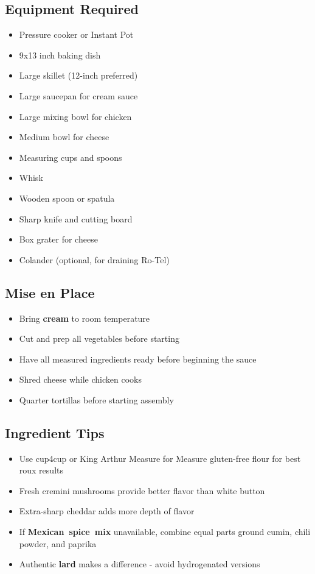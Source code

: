 \documentclass[11pt,letterpaper]{article}
\begin{document}
{\small
\setlength{\columnsep}{20pt}
\setlength{\multicolsep}{6pt}
\begin{multicols}{2}
\setlength{\parindent}{0pt}
\setlength{\parskip}{4pt}

\subsection*{Equipment Required}
\begin{itemize}
    \item Pressure cooker or Instant Pot
    \item 9x13 inch baking dish
    \item Large skillet (12-inch preferred)
    \item Large saucepan for cream sauce
    \item Large mixing bowl for chicken
    \item Medium bowl for cheese
    \item Measuring cups and spoons
    \item Whisk
    \item Wooden spoon or spatula
    \item Sharp knife and cutting board
    \item Box grater for cheese
    \item Colander (optional, for draining Ro-Tel)
\end{itemize}

\subsection*{Mise en Place}
\begin{itemize}
    \item Bring \textbf{cream} to room temperature
    \item Cut and prep all vegetables before starting
    \item Have all measured ingredients ready before beginning the sauce
    \item Shred cheese while chicken cooks
    \item Quarter tortillas before starting assembly
\end{itemize}

\subsection*{Ingredient Tips}
\begin{itemize}
    \item Use cup4cup or King Arthur Measure for Measure gluten-free flour for best roux results
    \item Fresh cremini mushrooms provide better flavor than white button
    \item Extra-sharp cheddar adds more depth of flavor
    \item If \textbf{Mexican~spice~mix} unavailable, combine equal parts ground cumin, chili powder, and paprika
    \item Authentic \textbf{lard} makes a difference - avoid hydrogenated versions
\end{itemize}


\end{multicols}}
\end{document}
